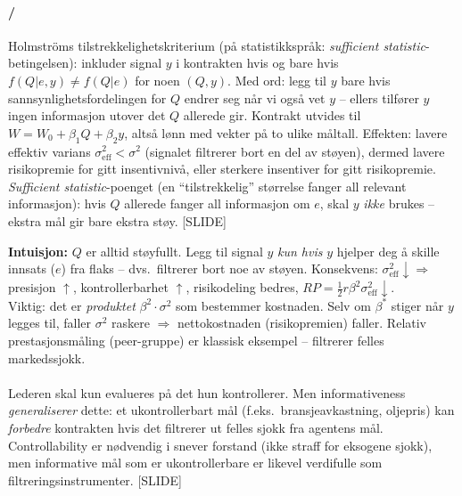 \paragraph{\quad\STwo/\SThree}
Holmströms tilstrekkelighetskriterium (på statistikkspråk: \emph{sufficient statistic}-betingelsen): inkluder signal $y$ i kontrakten hvis og bare hvis $f(Q|e,y)\neq f(Q|e)$ for noen $(Q,y)$. Med ord: legg til $y$ bare hvis sannsynlighetsfordelingen for $Q$ endrer seg når vi også vet $y$ -- ellers tilfører $y$ ingen informasjon utover det $Q$ allerede gir. Kontrakt utvides til $W=W_0+\beta_1 Q + \beta_2 y$, altså lønn med vekter på to ulike måltall. Effekten: lavere effektiv varians $\sigma^2_{\text{eff}} < \sigma^2$ (signalet filtrerer bort en del av støyen), dermed lavere risikopremie for gitt insentivnivå, eller sterkere insentiver for gitt risikopremie. \emph{Sufficient statistic}-poenget (en ``tilstrekkelig'' størrelse fanger all relevant informasjon): hvis $Q$ allerede fanger all informasjon om $e$, skal $y$ \emph{ikke} brukes -- ekstra mål gir bare ekstra støy. [SLIDE]

\begin{tcolorbox}[colback=blue!4, colframe=blue!50!black, boxrule=0.4pt, arc=2pt, left=6pt, right=6pt, top=4pt, bottom=4pt]
\textbf{Intuisjon:} $Q$ er alltid støyfullt. Legg til signal $y$ \emph{kun hvis} $y$ hjelper deg å skille innsats ($e$) fra flaks -- dvs.\ filtrerer bort noe av støyen. Konsekvens: $\sigma^2_{\text{eff}} \downarrow \Rightarrow$ presisjon $\uparrow$, kontrollerbarhet $\uparrow$, risikodeling bedres, $RP = \tfrac{1}{2} r \beta^2 \sigma^2_{\text{eff}} \downarrow$.\\[2pt]
Viktig: det er \emph{produktet} $\beta^2 \cdot \sigma^2$ som bestemmer kostnaden. Selv om $\beta^*$ stiger når $y$ legges til, faller $\sigma^2$ raskere $\Rightarrow$ nettokostnaden (risikopremien) faller. Relativ prestasjonsmåling (peer-gruppe) er klassisk eksempel -- filtrerer felles markedssjokk.
\end{tcolorbox}

\paragraph{\quad\STwo}
Lederen skal kun evalueres på det hun kontrollerer. Men informativeness \emph{generaliserer} dette: et ukontrollerbart mål (f.eks.\ bransjeavkastning, oljepris) kan \emph{forbedre} kontrakten hvis det filtrerer ut felles sjokk fra agentens mål. Controllability er nødvendig i snever forstand (ikke straff for eksogene sjokk), men informative mål som er ukontrollerbare er likevel verdifulle som filtreringsinstrumenter. [SLIDE]


